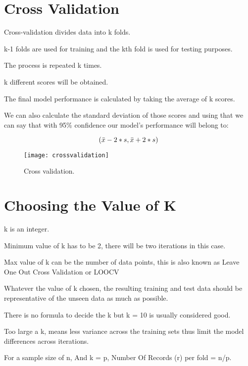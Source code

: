 	\section{Cross Validation}
	\begin{bulletedlist}
		\item Cross-validation divides data into k folds.
		\item k-1 folds are used for training and the kth fold is used for testing purposes.
		\item The process is repeated k times.
		\item k different scores will be obtained.
		\item The final model performance is calculated by taking the average of k scores.
		\item We can also calculate the standard deviation of those scores and using that we can say that with 95\% confidence our model's performance will belong to:
	\end{bulletedlist}
	\begin{equation}
		\left(\mbox{$\bar{x}$} - 2*\mbox{$s$}{}, \mbox{$\bar{x}$} + 2*\mbox{$s$}{}\right)
	\end{equation}
	\begin{figure}[h]
		\centering
		\texttt{[image: crossvalidation]}
		\caption{Cross validation.}
		\label{fig:normaldistrution}
	\end{figure}


	\section{Choosing the Value of K}
	\begin{bulletedlist}
		\item k is an integer.
		\item Minimum value of k has to be 2, there will be two iterations in this case.
		\item Max value of k can be the number of data points, this is also known as Leave One Out Cross Validation or LOOCV
		\item Whatever the value of k chosen, the resulting training and test data should be representative of the unseen data as much as possible.
		\item There is no formula to decide the k but k = 10 is usually considered good.
		\item Too large a k, means less variance across the training sets thus limit the model differences across iterations.
		\item For a sample size of n, And k = p, Number Of Records (r) per fold = n/p.
	\end{bulletedlist}


